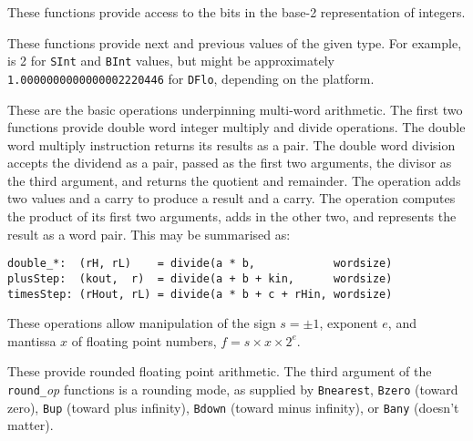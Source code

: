 These functions provide access to the bits in the base-2 representation
of integers.

These functions provide next and previous values of the given type.
For example,  is 2 for \verb"SInt" and \verb"BInt" values,
but might be approximately
\verb"1.0000000000000002220446"
for \verb"DFlo", depending on the platform.

These are the basic operations underpinning multi-word arithmetic.%
The first two functions
provide double word integer multiply and divide operations.
The double word multiply instruction returns its results as a pair.
The double word division accepts the dividend as a pair,
passed as the first two arguments,
the divisor as the third argument, and returns the quotient and remainder.
The  operation adds two values and a carry to produce
a result and a carry.
The  operation computes the product of its first two
arguments, adds in the other two, and represents the result as a word pair.
This may be summarised as:

\begin{small}
\begin{verbatim}
double_*:  (rH, rL)    = divide(a * b,            wordsize)
plusStep:  (kout,  r)  = divide(a + b + kin,      wordsize)
timesStep: (rHout, rL) = divide(a * b + c + rHin, wordsize)
\end{verbatim}
\end{small}


These operations allow manipulation of the
sign $s = \pm 1$, exponent $e$, 
and mantissa $x$ of floating point numbers, $f = s \times x \times 2^e$.


These provide rounded floating point arithmetic.%
The third argument
of the \verb"round_"{\it op\/} functions is a rounding mode, as supplied
by \verb"Bnearest",
\verb"Bzero" (toward zero),
\verb"Bup" (toward plus infinity),
\verb"Bdown" (toward minus infinity),
or \verb"Bany" (doesn't matter).


